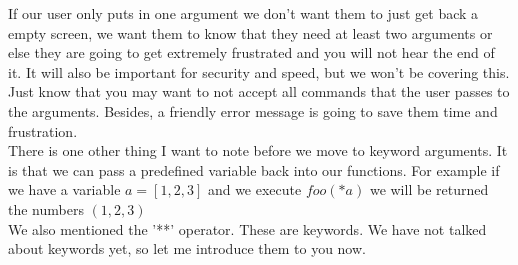 \documentclass[11pt]{article}   %
\begin{document}
If our user only puts in one argument we don't want them to just get back a empty screen, we want them to know that they need at least two arguments or else they are going to get extremely frustrated and you will not hear the end of 
it.  It will also be important for security and speed, but we won't be covering this.  Just know that you may want to not accept all commands that the user passes to the arguments.  Besides, a friendly error message is going to 
save them time and frustration.\\
There is one other thing I want to note before we move to keyword arguments.  It is that we can pass a predefined variable back into our functions.  For example if we have a variable $a=[1,2,3]$ and we execute $foo(*a)$ we will be 
returned the numbers $(1,2,3)$
\\
We also mentioned the '**' operator.  These are keywords.  We have not talked about keywords yet, so let me introduce them to you now.
\end{document}
